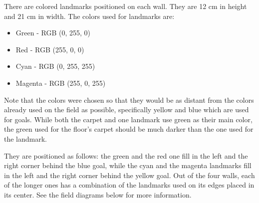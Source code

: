 \documentclass{article}
\begin{document}
There are colored landmarks positioned on each wall. They are 12 cm in height
and 21 cm in width. The colors used for landmarks are:

\begin{itemize}
\item Green - RGB (0, 255, 0)

\item Red - RGB (255, 0, 0)

\item Cyan - RGB (0, 255, 255)

\item Magenta - RGB (255, 0, 255)

\end{itemize}

Note that the colors were chosen so that they would be as distant from the
colors already used on the field as possible, specifically yellow and blue
which are used for goals. While both the carpet and one landmark use green as
their main color, the green used for the floor's carpet should be much darker
than the one used for the landmark.

They are positioned as follows: the green and the red one fill in the left and
the right corner behind the blue goal, while the cyan and the magenta landmarks
fill in the left and the right corner behind the yellow goal. Out of the four
walls, each of the longer ones has a combination of the landmarks used on its
edges placed in its center. See the field diagrams below for more
information.
\end{document}
